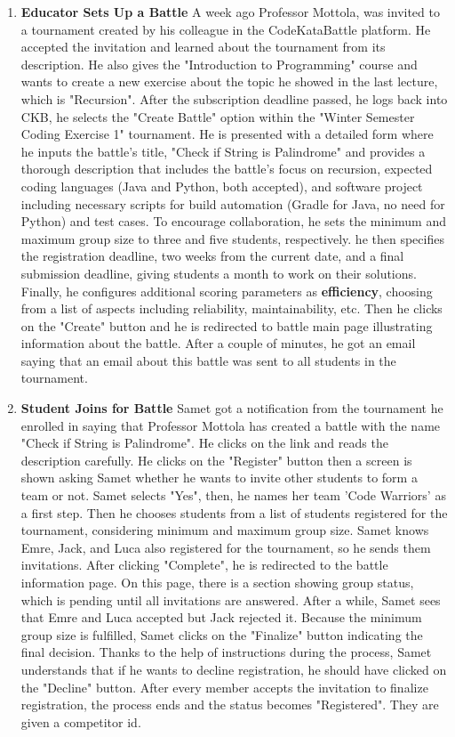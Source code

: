 \begin{enumerate}
    \item \textbf{Educator Sets Up a Battle} \newline A week ago Professor Mottola, was invited to a tournament created by his colleague in the CodeKataBattle platform. He accepted the invitation and learned about the tournament from its description. He also gives the "Introduction to Programming" course and wants to create a new exercise about the topic he showed in the last lecture, which is "Recursion". After the subscription deadline passed, he logs back into CKB, he selects the "Create Battle" option within the "Winter Semester Coding Exercise 1" tournament. He is presented with a detailed form where he inputs the battle's title, "Check if String is Palindrome" and provides a thorough description that includes the battle's focus on recursion, expected coding languages (Java and Python, both accepted), and software project including necessary scripts for build automation (Gradle for Java, no need for Python) and test cases. To encourage collaboration, he sets the minimum and maximum group size to three and five students, respectively. he then specifies the registration deadline, two weeks from the current date, and a final submission deadline, giving students a month to work on their solutions. Finally, he configures additional scoring parameters as \textbf{efficiency}, choosing from a list of aspects including reliability, maintainability, etc. Then he clicks on the "Create" button and he is redirected to battle main page illustrating information about the battle. After a couple of minutes, he got an email saying that an email about this battle was sent to all students in the tournament.\newline \newline
    \item \textbf{Student Joins for Battle} \newline Samet got a notification from the tournament he enrolled in saying that Professor Mottola has created a battle with the name "Check if String is Palindrome". He clicks on the link and reads the description carefully. He clicks on the "Register" button then a screen is shown asking Samet whether he wants to invite other students to form a team or not. Samet selects "Yes", then, he names her team 'Code Warriors' as a first step. Then he chooses students from a list of students registered for the tournament, considering minimum and maximum group size. Samet knows Emre, Jack, and Luca also registered for the tournament, so he sends them invitations. After clicking "Complete", he is redirected to the battle information page. On this page, there is a section showing group status, which is pending until all invitations are answered. After a while, Samet sees that Emre and Luca accepted but Jack rejected it. Because the minimum group size is fulfilled, Samet clicks on the "Finalize" button indicating the final decision. Thanks to the help of instructions during the process, Samet understands that if he wants to decline registration, he should have clicked on the "Decline" button. After every member accepts the invitation to finalize registration, the process ends and the status becomes "Registered". They are given a competitor id.

\end{enumerate}
